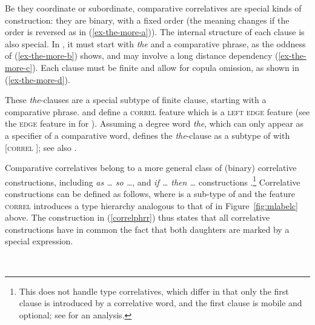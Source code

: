 Be they coordinate or subordinate, comparative correlatives are special kinds of construction: they
are binary, with a fixed order (the meaning changes if the order is reversed as in
(\ref{ex-the-more-a})). The internal structure of each clause is also special. In , it
must start with \emph{the} and a comparative phrase, as the oddness of (\ref{ex-the-more-b}) shows,
and may involve a long distance dependency (\ref{ex-the-more-c}). Each clause must be finite and
allow for copula omission, as shown in (\ref{ex-the-more-d}).

\eal
\label{intell}
\zl

These \emph{the}-clauses  are a special subtype of finite clause, starting with a comparative
phrase. \citet[]{Abeille:Borsley:Espinal:06} and \citet[]{Borsley:11} 
define a \textsc{correl} feature which is a \textsc{left edge} feature (see the \textsc{edge}
feature in \citealt{Bonami:2004} for  ). Assuming a degree word \textit{the}, which can only appear as a specifier of
a comparative word, \citet[]{Borsley:11}  defines the \textit{the}-clause as a subtype of  with [\textsc{correl} ]; see also \citet[]{fgsag08}.

Comparative correlatives belong to a more general class of (binary) correlative constructions, including \emph{as \ldots{} so \ldots{}},
and \emph{if \ldots{} then  \ldots{}} constructions  
\parencites[Section~3.2]{Borsley:04}[--18]{Borsley:11}.\footnote{This does not handle  type correlatives, which differ in that  only the first clause is introduced by a correlative word, and the first clause is mobile and optional; see \citet[228]{pollardsag} for an analysis.}
Correlative constructions can be defined as follows, 
where  is a sub-type of 
 and the feature \textsc{correl} introduces a  type
hierarchy analogous to that of  in Figure~\ref{fig:mlabelc} above.
The construction in (\ref{correlphrr}) thus states that all correlative
constructions have in common the fact that both daughters are marked by a special expression. 

\largerpage
\ea
\label{correlphrr}
 \impl\\
\z

